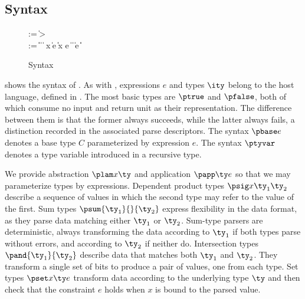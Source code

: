 \subsection{\ddc{} Syntax}
\begin{figure}
{\small
\begin{bnf}
   \meta{\gk} \::= \kty \| \ity \-> \gk 
                               \pext{\| \gk \-> \gk} \\
   \meta{\ty} \::= 
    \ptrue\| \pfalse \|  \| 
    \plam{\var}{\ity}{\ty} \|  \nlalt
    \psig x \ty \ty \| \psum \ty e \ty \| \pand \ty \ty \|
    \pset x \ty e \| \pseq \ty {} \nlalt
    \ptyvar       \| \pmu{\ptyvar}{\ty} \| \pcompute e \ity \| \pabsorb \ty \| \pscan{\ty} 
\end{bnf}
}
\caption{\ddc{} Syntax}
\label{fig:ddc-syntax}
\end{figure}
 shows the syntax of \ddc{}. As with
\ipads{}, expressions $e$ and types $\ity$ belong to the host
language, defined in .
The most basic types are $\ptrue$ and $\pfalse$, both of which consume
no input and return unit as their
representation.  The difference between them is that
the former always succeeds, while the latter always fails, a
distinction recorded in the associated parse descriptors.
The syntax $\pbase e$ denotes a base type $C$ parameterized by 
expression $e$. The syntax $\ptyvar$ denotes a type variable
introduced in a recursive type.

We provide abstraction $\plam x {} \ty$ and application
$\papp \ty e$ so that we may parameterize types by expressions.
Dependent product types $\psig x {\ty_1} {\ty_2}$ describe a sequence
of values in which the second type may refer to the value of the first.
Sum types $\psum {\ty_1} {} {\ty_2}$
express flexibility in the data format, as they parse
data matching either $\ty_1$ or $\ty_2$. Sum-type parsers
are deterministic, always transforming the data according to $\ty_1$
if both types parse without errors, and
according to $\ty_2$ if neither do. Intersection types
$\pand {\ty_1} {\ty_2}$ describe data that matches both $\ty_1$ and
$\ty_2$. They transform a single set of bits to produce
a pair of values, one from each type. Set types $\pset x \ty e$
transform data according to the underlying type $\ty$ and
then check that the constraint $e$ holds when $x$ is bound to the parsed value.


